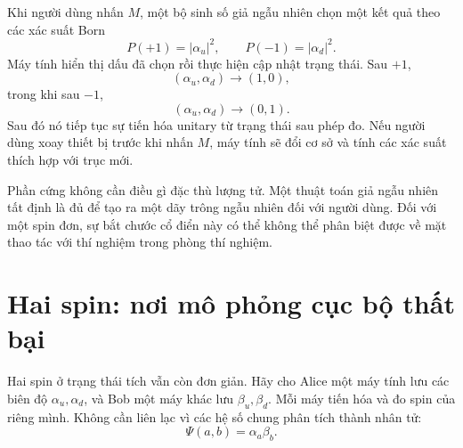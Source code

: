 Khi người dùng nhấn \(M\), một bộ sinh số giả ngẫu nhiên chọn một kết quả theo các xác suất Born
\begin{equation}
P(+1)=|\alpha_u|^2,
\qquad
P(-1)=|\alpha_d|^2.
\label{eq:l8-one-spin-born}
\end{equation}
Máy tính hiển thị dấu đã chọn rồi thực hiện cập nhật trạng thái. Sau \(+1\),
\begin{equation}
(\alpha_u,\alpha_d)\longrightarrow(1,0),
\end{equation}
trong khi sau \(-1\),
\begin{equation}
(\alpha_u,\alpha_d)\longrightarrow(0,1).
\end{equation}
Sau đó nó tiếp tục sự tiến hóa unitary từ trạng thái sau phép đo. Nếu người dùng xoay thiết bị trước khi nhấn \(M\), máy tính sẽ đổi cơ sở và tính các xác suất thích hợp với trục mới.

Phần cứng không cần điều gì đặc thù lượng tử. Một thuật toán giả ngẫu nhiên tất định là đủ để tạo ra một dãy trông ngẫu nhiên đối với người dùng. Đối với một spin đơn, sự bắt chước cổ điển này có thể không thể phân biệt được về mặt thao tác với thí nghiệm trong phòng thí nghiệm.

\begin{classroomqa}
\end{classroomqa}

\begin{classroomqa}
\end{classroomqa}

\section{Hai spin: nơi mô phỏng cục bộ thất bại}

Hai spin ở trạng thái tích vẫn còn đơn giản. Hãy cho Alice một máy tính lưu các biên độ \(\alpha_u,\alpha_d\), và Bob một máy khác lưu \(\beta_u,\beta_d\). Mỗi máy tiến hóa và đo spin của riêng mình. Không cần liên lạc vì các hệ số chung phân tích thành nhân tử:
\begin{equation}
\Psi(a,b)=\alpha_a\beta_b.
\end{equation}

